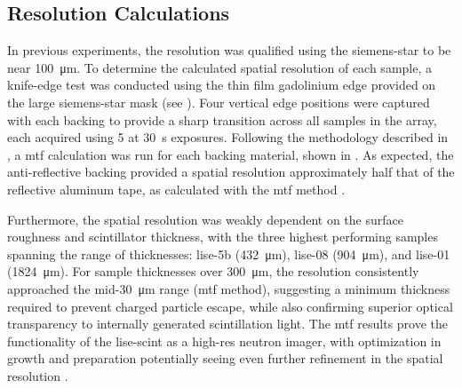 \documentclass[../../../main.tex]{subfiles}%
\begin{document}
%
    \subsection{Resolution Calculations}%
    \label{sec:chapter-4:scintillator-array:resolution-calculations}%
    In previous experiments, the resolution was qualified using the \gls{siemens-star} to be near \SI{100}{\micro\meter}.
    To determine the calculated spatial resolution of each sample, a knife-edge test was conducted using the thin film gadolinium edge provided on the large \gls{siemens-star} mask (see ).
    Four vertical edge positions were captured with each backing to provide a sharp transition across all samples in the array, each acquired using \SI{5}{\frames} at \SI{30}{\second} exposures.
    Following the methodology described in , a \gls{mtf} calculation was run for each backing material, shown in .
    As expected, the anti-reflective backing provided a spatial resolution approximately half that of the reflective aluminum tape, as calculated with the \gls{mtf} method \cite{Lukosi_2017}.
    \par%
    Furthermore, the spatial resolution was weakly dependent on the surface roughness and scintillator thickness, with the three highest performing samples spanning the range of thicknesses: \gls{lise-5b} (\SI{432}{\micro\meter}), \gls{lise-08} (\SI{904}{\micro\meter}), and \gls{lise-01} (\SI{1824}{\micro\meter}).
    For sample thicknesses over \SI{300}{\micro\meter}, the resolution consistently approached the mid{\--}\SI{30}{\micro\meter} range (\gls{mtf} method), suggesting a minimum thickness required to prevent charged particle escape, while also confirming superior optical transparency to internally generated scintillation light.
    The \gls{mtf} results prove the functionality of the \gls{lise-scint} as a \gls{high-res} neutron imager, with optimization in growth and preparation potentially seeing even further refinement in the spatial resolution \cite{Lukosi_2017}.
\end{document}
